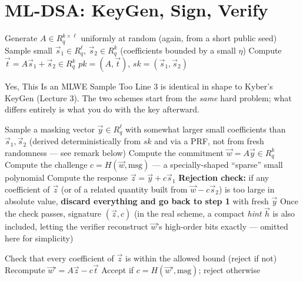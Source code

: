 \section{ML-DSA: KeyGen, Sign, Verify}
\label{sec:L4:ml-dsa-keygen-sign-verify}

\begin{algorithm}[h]
\caption{ML-DSA.KeyGen}
\begin{algorithmic}[1]
\State Generate $A \in R_q^{k\times \ell}$ uniformly at random (again, from a short public seed)
\State Sample small $\vec s_1 \in R_q^\ell$, $\vec s_2 \in R_q^k$ (coefficients bounded by a small $\eta$)
\State Compute $\vec t = A\vec s_1 + \vec s_2 \in R_q^k$
\State \Return $pk = (A, \vec t)$, $sk = (\vec s_1, \vec s_2)$
\end{algorithmic}
\end{algorithm}

\begin{rmkbox}{Yes, This Is an MLWE Sample Too}
Line 3 is identical in shape to Kyber's KeyGen (Lecture 3). The two schemes start from the \emph{same} hard problem; what differs entirely is what you do with the key afterward.
\end{rmkbox}

\begin{algorithm}[h]
\caption{ML-DSA.Sign$(sk = (\vec s_1,\vec s_2),\ \text{msg})$ --- Simplified}
\begin{algorithmic}[1]
\State Sample a masking vector $\vec y \in R_q^\ell$ with somewhat larger small coefficients than $\vec s_1,\vec s_2$ (derived deterministically from $sk$ and  via a PRF, not from fresh randomness --- see remark below)
\State Compute the commitment $\vec w = A\vec y \in R_q^k$
\State Compute the challenge $c = H(\vec w, \text{msg})$ --- a specially-shaped ``sparse'' small polynomial
\State Compute the response $\vec z = \vec y + c\vec s_1$
\State \textbf{Rejection check:} if any coefficient of $\vec z$ (or of a related quantity built from $\vec w - c\vec s_2$) is too large in absolute value, \textbf{discard everything and go back to step 1} with fresh $\vec y$
\State Once the check passes, \Return signature $(\vec z, c)$ (in the real scheme, a compact \emph{hint} $\vec h$ is also included, letting the verifier reconstruct $\vec w$'s high-order bits exactly --- omitted here for simplicity)
\end{algorithmic}
\end{algorithm}

\begin{algorithm}[h]
\caption{ML-DSA.Verify$(pk=(A,\vec t),\ \text{msg},\ (\vec z, c))$ --- Simplified}
\begin{algorithmic}[1]
\State Check that every coefficient of $\vec z$ is within the allowed bound (reject if not)
\State Recompute $\vec w' = A\vec z - c\vec t$
\State Accept if $c = H(\vec w', \text{msg})$; reject otherwise
\end{algorithmic}
\end{algorithm}

